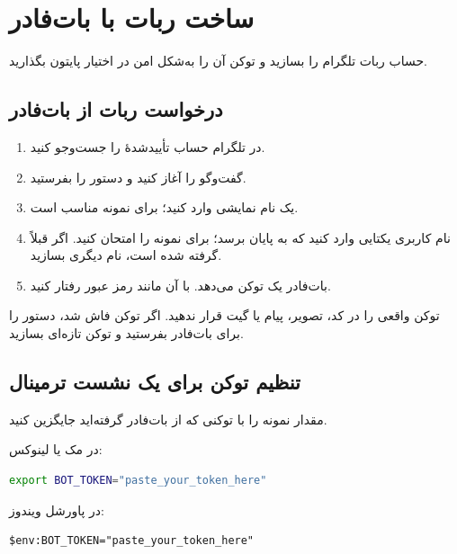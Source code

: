 \chapter{ساخت ربات با بات‌فادر}

\begin{goalbox}
حساب ربات تلگرام را بسازید و توکن آن را به‌شکل امن در اختیار پایتون بگذارید.
\end{goalbox}

\section{درخواست ربات از بات‌فادر}

\begin{enumerate}
\item در تلگرام حساب تأییدشدهٔ
را جست‌وجو کنید.
\item گفت‌وگو را آغاز کنید و دستور
را بفرستید.
\item یک نام نمایشی وارد کنید؛ برای نمونه
مناسب است.
\item نام کاربری یکتایی وارد کنید که به
پایان برسد؛ برای نمونه
را امتحان کنید. اگر قبلاً گرفته شده است، نام دیگری بسازید.
\item بات‌فادر یک توکن می‌دهد. با آن مانند رمز عبور رفتار کنید.
\end{enumerate}

\begin{warningbox}
توکن واقعی را در کد، تصویر، پیام یا گیت قرار ندهید. اگر توکن فاش شد، دستور
را برای بات‌فادر بفرستید و توکن تازه‌ای بسازید.
\end{warningbox}

\section{تنظیم توکن برای یک نشست ترمینال}

مقدار نمونه را با توکنی که از بات‌فادر گرفته‌اید جایگزین کنید.

در مک یا لینوکس:
\begin{LTR}
\begin{lstlisting}[language=bash,numbers=none]
export BOT_TOKEN="paste_your_token_here"
\end{lstlisting}
\end{LTR}

در پاورشل ویندوز:
\begin{LTR}
\begin{lstlisting}[language={},numbers=none]
$env:BOT_TOKEN="paste_your_token_here"
\end{lstlisting}
\end{LTR}

